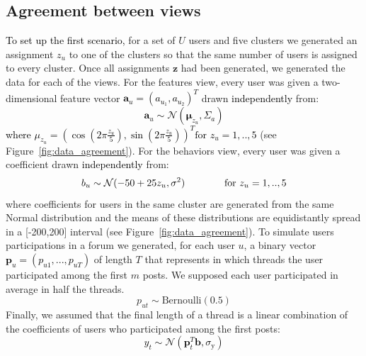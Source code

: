 \documentclass[smallextended]{svjour3}          %
\newcommand\alberto[1]{\textcolor{black}{#1}}
\begin{document}
\subsection{Agreement between views}
\alberto{To set up the first scenario,} for a set of $U$ users and five clusters we generated an assignment $z_u$ to one of the clusters so that the same number of users is assigned to every cluster.
Once all assignments $\mathbf{z}$ had been generated, we generated the data for each of the views. For the features view, every user was given a two-dimensional feature vector \alberto{$\mathbf{a}_u=(a_{u_1}, a_{u_2})^T$} drawn \alberto{independently} from:
\alberto{
	\begin{equation}
	\mathbf{a}_u \sim \mathcal{N}\left(\boldsymbol{\mu}_{z_u}, \Sigma_a \right)
	\end{equation}
}
\alberto{where
	$\mu_{z_u}=\left(\cos(2\pi \frac{z_u}{5}), \sin(2\pi \frac{z_u}{5})\right)^T \text{for } z_u=1,..,5$}
(see Figure~\ref{fig:data_agreement}). For the behaviors view, every user was given a coefficient drawn \alberto{independently} from:
\begin{equation}
b_u \sim \mathcal{N}(-50 +25z_u, \sigma^2) 
\alberto{\qquad\qquad \text{for } z_u=1,..,5}
\end{equation}
where coefficients for users in the same cluster are generated from the same Normal distribution and the means of these distributions are equidistantly spread in a [-200,200] interval (see Figure~\ref{fig:data_agreement}).
To simulate users participations in a forum we generated, for each user $u$, a binary vector \alberto{$\mathbf{p}_u = (p_{u1},...,p_{uT})$} of length $T$ that represents in which threads the user participated among the first $m$ posts. We supposed each user participated in average in half the threads.
\begin{equation}
p_{ut} \sim \text{Bernoulli}(0.5)
\end{equation}
Finally, we assumed that the final length of a thread is a linear combination of the coefficients of users who participated among the first posts:
\alberto{
	\begin{equation}
	y_t \sim \mathcal{N}(\mathbf{p}_t^T \mathbf{b}, \sigma_\text{y})
	\end{equation}
}
\end{document}
